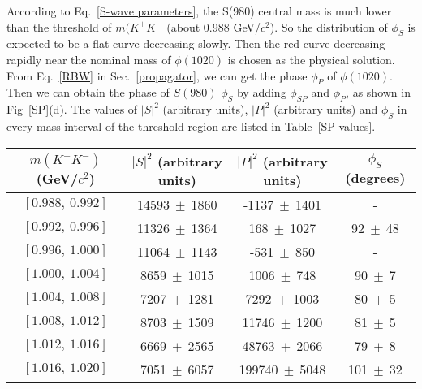 \documentclass[aps,prd,twocolumn,showpacs,amsmath,amssymb]{revtex4-1}
\begin{document}
    According to Eq.~\ref{S-wave parameters}, the S(980) central mass is much lower than the threshold of $m(K^{+}K^{-}$ (about 0.988 GeV/$c^{2}$).
    So the distribution of $\phi_{S}$ is expected to be a flat curve decreasing slowly.
    Then the red curve decreasing rapidly near the nominal mass of $\phi(1020)$ is chosen as the physical solution.
    From Eq.~\ref{RBW} in Sec.~\ref{propagator}, we can get the phase $\phi_{P}$ of $\phi(1020)$.
    Then we can obtain the phase of $S(980)$ $\phi_{S}$ by adding $\phi_{SP}$ and $\phi_{P}$, as shown in Fig~\ref{SP}(d).
    The values of $\left|S\right|^{2}$ (arbitrary units), $\left|P\right|^{2}$ (arbitrary units) and $\phi_{S}$ in every mass interval of the threshold region are listed in Table~\ref{SP-values}.
    \begin{table*}[htbp]
        \caption{
            The values of $\left|S\right|^{2}$ (arbitrary units), $\left|P\right|^{2}$ (arbitrary units) and $\phi_{S}$.
            The values of 
            Uncertainties in the table are statistical only.
        }
        \label{SP-values}
        \begin{center}
            \begin{tabular}{cccc}
                \hline\hline
                $m(K^{+}K^{-})$ (GeV/$c^{2}$) & $\left|S\right|^{2}$ (arbitrary units) & $\left|P\right|^{2}$ (arbitrary units) & $\phi_{S}$ (degrees)\\
                \hline
                $[0.988,\ 0.992]$   &	14593$\ \pm\ $1860&	-1137$\ \pm\ $1401&	 - \\ 	
                $[0.992,\ 0.996]$   &	11326$\ \pm\ $1364&	168$\ \pm\ $1027&	92$\ \pm\ $48 \\ 	
                $[0.996,\ 1.000]$   &	11064$\ \pm\ $1143&	-531$\ \pm\ $850&	 - \\ 	
                $[1.000,\ 1.004]$   &	8659$\ \pm\ $1015&	1006$\ \pm\ $748&	90$\ \pm\ $7 \\ 	
                $[1.004,\ 1.008]$   &	7207$\ \pm\ $1281&	7292$\ \pm\ $1003&	80$\ \pm\ $5 \\ 	
                $[1.008,\ 1.012]$   &	8703$\ \pm\ $1509&	11746$\ \pm\ $1200&	81$\ \pm\ $5 \\ 	
                $[1.012,\ 1.016]$   &	6669$\ \pm\ $2565&	48763$\ \pm\ $2066&	79$\ \pm\ $8 \\ 	
                $[1.016,\ 1.020]$   &	7051$\ \pm\ $6057&	199740$\ \pm\ $5048&	101$\ \pm\ $32 \\ 	

\end{tabular}
\end{center}
\end{table*}
\end{document}
